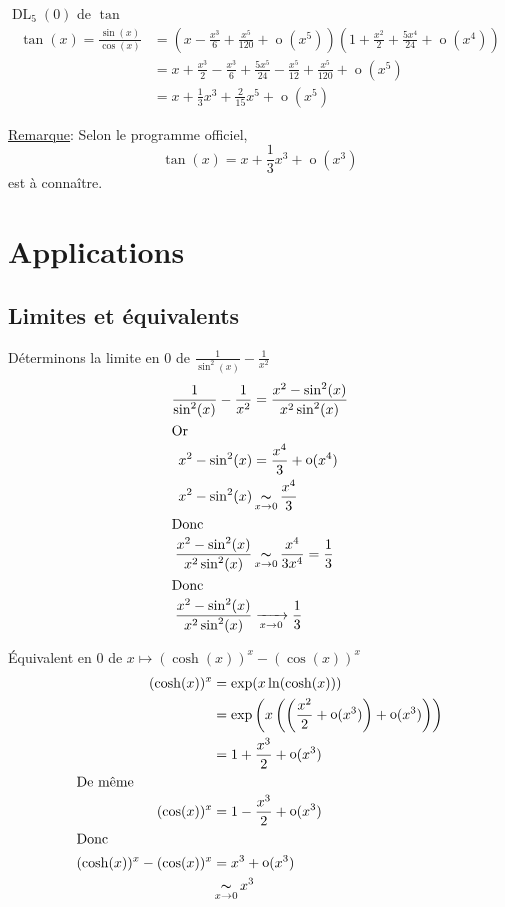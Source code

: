 \documentclass[10pt,a4paper]{article}
\theoremstyle{definition}
\DeclareMathOperator*{\eqv}{\thicksim}
\DeclareMathOperator*{\negl}{o}
\DeclareMathOperator{\dl}{DL}
\begin{document}
$\dl_5(0)$ de $\tan$
\begin{align*}
\tan(x) = \frac{\sin(x)}{\cos(x)} &= \left(x - \frac{x^3}{6} + \frac{x^5}{120} + \negl(x^5)\right)\left(1 + \frac{x^2}{2} + \frac{5 x^4}{24} + \negl(x^4)\right) \\
&= x + \frac{x^3}{2} - \frac{x^3}{6} + \frac{5 x^5}{24} - \frac{x^5}{12} + \frac{x^5}{120} + \negl(x^5) \\
&= x + \frac{1}{3} x^3 + \frac{2}{15} x^5 + \negl(x^5)
\end{align*} \medskip

\noindent \uline{Remarque}: Selon le programme officiel,
\[\tan(x) = x + \frac{1}{3} x^3 + \negl(x^3)\]
est à connaître.

\section{Applications}
\subsection{Limites et équivalents}
Déterminons la limite en 0 de $\frac{1}{\sin^2(x)} - \frac{1}{x^2}$
\begin{align*}
\frac{1}{\sin^2(x)} - \frac{1}{x^2} &= \frac{x^2 - \sin^2(x)}{x^2 \sin^2(x)} \\
\intertext{Or}
x^2 - \sin^2(x) &= \frac{x^4}{3} + \negl(x^4) \\
x^2 - \sin^2(x) &\eqv\limits_{x \to 0} \frac{x^4}{3} \\
\intertext{Donc}
\frac{x^2 - \sin^2(x)}{x^2 \sin^2(x)} &\eqv\limits_{x \to 0} \frac{x^4}{3 x^4} = \frac{1}{3} \\
\intertext{Donc}
\frac{x^2 - \sin^2(x)}{x^2 \sin^2(x)} &\xrightarrow[x \to 0]{} \frac{1}{3}
\end{align*}

Équivalent en 0 de $x \mapsto (\cosh(x))^x - (\cos(x))^x$
\begin{align*}
(\cosh(x))^x &= \exp(x \ln(\cosh(x))) \\
&= \exp\left(x\left(\left(\frac{x^2}{2} + \negl(x^3)\right) + \negl(x^3)\right)\right) \\
&= 1 + \frac{x^3}{2} + \negl(x^3) \\
\intertext{De même}
(\cos(x))^x &= 1 - \frac{x^3}{2} + \negl(x^3) \\
\intertext{Donc}
(\cosh(x))^x - (\cos(x))^x &= x^3 + \negl(x^3) \\
&\eqv\limits_{x \to 0} x^3
\end{align*}
\end{document}

